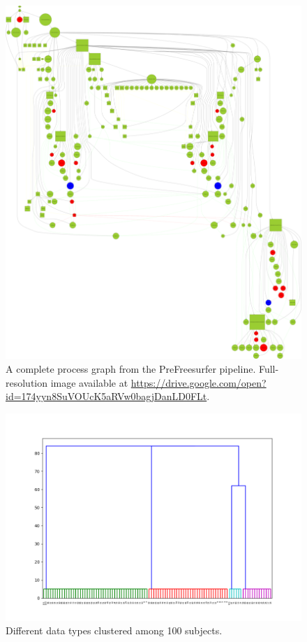 \documentclass[a4paper,num-refs]{oup-contemporary}
\begin{document}
\begin{figure}
  \includegraphics[width=1\textwidth]{images/graph}
  \caption{A complete process graph from the PreFreesurfer pipeline.
Full-resolution image available at \url{https://drive.google.com/open?id=174yyn8SuVOUcK5aRVw0bagjDanLD0FLt}.}
  \label{fig:complete-graph}
\end{figure}

\begin{figure}
  \includegraphics[width=\textwidth]{images/hclusters}
  \caption{Different data types clustered among 100 subjects.}
  \label{fig:subj-clusters}
\end{figure}



\end{document}
